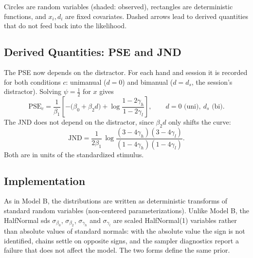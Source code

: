 \documentclass[11pt]{article}
\begin{document}
\begin{center}
\end{center}

\noindent
Circles are random variables (shaded: observed), rectangles are deterministic
functions, and $x_i, d_i$ are fixed covariates. Dashed arrows lead to derived
quantities that do not feed back into the likelihood.

\subsection{Derived Quantities: PSE and JND}

The PSE now depends on the distractor. For each hand and session it is recorded for
both conditions $c$: unimanual ($d = 0$) and bimanual ($d = d_s$, the session's
distractor). Solving $\psi = \tfrac12$ for $x$ gives
\[
  \text{PSE}_{c} = \frac{1}{\beta_1}\left[-\big(\beta_0 + \beta_2 d\big) + \log\frac{1-2\gamma_h}{1-2\gamma_l}\right],
  \qquad d = 0 \text{ (uni)},\ d_s \text{ (bi)}.
\]
The JND does not depend on the distractor, since $\beta_2 d$ only shifts the curve:
\[
  \text{JND} = \frac{1}{2\beta_1}\,\log\frac{(3-4\gamma_h)(3-4\gamma_l)}{(1-4\gamma_h)(1-4\gamma_l)} .
\]
Both are in units of the standardized stimulus.

\subsection{Implementation}

As in Model B, the distributions are written as deterministic transforms of
standard random variables (non-centered parameterizations). Unlike Model B, the
HalfNormal sds $\sigma_{\beta_0}$, $\sigma_{\beta_2}$, $\sigma_{\gamma_h}$ and
$\sigma_{\gamma_l}$ are scaled HalfNormal(1) variables rather than absolute values of
standard normals: with the absolute value the sign is not identified, chains settle
on opposite signs, and the sampler diagnostics report a failure that does not affect
the model. The two forms define the same prior.
\end{document}
